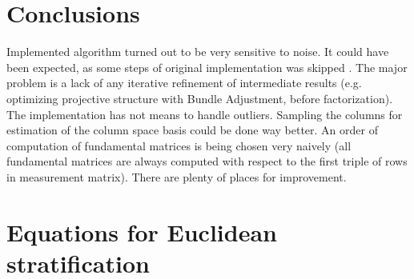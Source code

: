 \documentclass[12pt]{article}
\begin{document}
\section{Conclusions}

Implemented algorithm turned out to be very sensitive to noise. It could have
been expected, as  some steps of original implementation was skipped
\cite{svoboda05}. The major problem is a   lack of any iterative refinement of
intermediate results (e.g. optimizing projective structure   with Bundle
Adjustment, before factorization). The implementation has not means to handle
outliers. Sampling the columns for estimation of the column space basis could be
done way    better. An order of computation of fundamental matrices is being
chosen very naively (all    fundamental matrices are always computed with
respect to the first triple of rows in    measurement matrix). There are plenty
of places for improvement.




\newpage

\section{Equations for Euclidean stratification}
\end{document}

